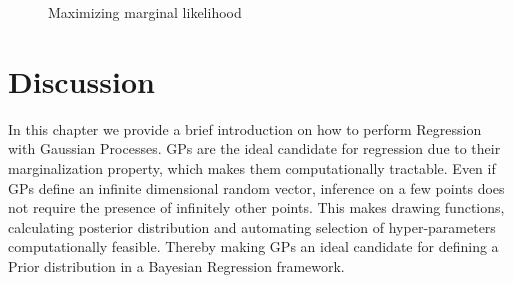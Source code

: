   \begin{figure}[!ht]
  \centering
    \quad
  \quad
       \caption{Maximizing marginal likelihood}\label{figGPRMarginalOptimized}
\end{figure}

\section{Discussion}\label{secCH2Discussion}
In this chapter we provide a brief introduction on how to perform Regression with Gaussian Processes. GPs are the ideal candidate for regression due to their marginalization property, which makes them computationally tractable. Even if GPs define an infinite dimensional random vector, inference on a few points does not require the presence of infinitely other points. This makes drawing functions, calculating posterior distribution and automating selection of hyper-parameters computationally feasible. Thereby making GPs an ideal candidate for defining a Prior distribution in a Bayesian Regression framework. 

